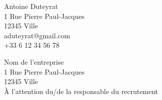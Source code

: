 
Antoine Duteyrat \\
1 Rue Pierre Paul-Jacques \\
12345 Ville \\
aduteyrat@gmail.com \\
+33 6 12 34 56 78


\begin{flushright}
Nom de l'entreprise \\
1 Rue Pierre Paul-Jacques \\
12345 Ville \\
À l'attention du/de la responsable du recrutement \\
\end{flushright}